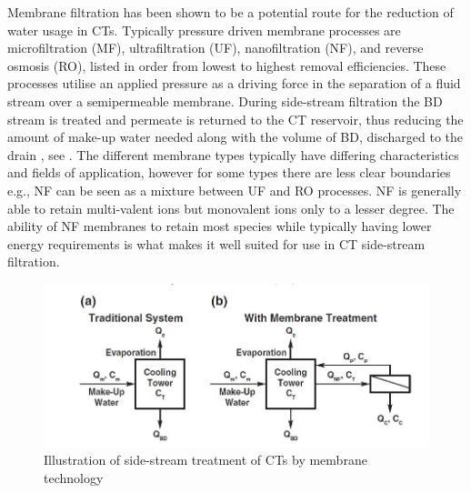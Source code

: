 Membrane filtration has been shown to be a potential route for the reduction of water usage in CTs.  
Typically pressure driven membrane processes are microfiltration (MF),
ultrafiltration (UF), nanofiltration (NF), and reverse osmosis (RO), listed in order from lowest to highest removal efficiencies. 
These processes utilise an applied pressure as a driving force in the separation of a fluid stream over a semipermeable membrane. 
During side-stream filtration the BD stream is treated and permeate is returned to the CT reservoir, thus reducing the amount of make-up water needed along with the volume of BD, discharged to the drain \cite{farahanniRecoveryCoolingTower_2016}, see .
The different membrane types typically have differing characteristics and fields of application, however for some types there are less clear boundaries e.g., NF can be seen as a mixture between UF and RO processes.\citep{keo}
NF is generally able to retain multi-valent ions but monovalent ions only to a lesser degree. \citep{keo}
The ability of NF membranes to retain most species while typically having lower energy requirements is what makes it well suited for use in CT side-stream filtration.  \citep{farahanniRecoveryCoolingTower_2016} 

\begin{figure}[H]
    \centering
    \includegraphics[width=1\textwidth]{Billeder/intro/CT_CTandNF.JPG}
    \caption{\citep{altmanMembraneTreatmentSidestream2012} Illustration of side-stream treatment of CTs by membrane technology}
    \label{fig:CT_working_principle}
\end{figure}



